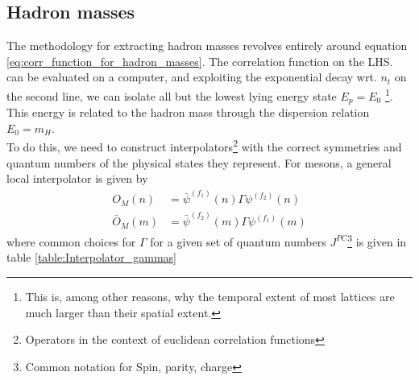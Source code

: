 \documentclass[a4paper,10pt]{book}
\begin{document}
\subsection{Hadron masses}\label{hadron_masses}
The methodology for extracting hadron masses revolves entirely around equation \eqref{eq:corr_function_for_hadron_masses}. The correlation function on the LHS. can be evaluated on a computer, and exploiting the exponential decay wrt. $n_t$ on the second line, we can isolate all but the lowest lying energy state $E_p=E_0$ \footnote{This is, among other reasons, why the temporal extent of most lattices are much larger than their spatial extent.}. This energy is related to the hadron mass through the dispersion relation $E_0 = m_H$.\\ To do this, we need to construct interpolators\footnote{Operators in the context of euclidean correlation functions} with the correct symmetries and quantum numbers of the physical states they represent. For mesons, a general local interpolator is given by
\begin{equation}
\begin{aligned} 
O_{M}(n)&=\bar{\psi}^{\left(f_{1}\right)}(n) \Gamma \psi^{\left(f_{2}\right)}(n)\\ \bar{O}_{M}(m)&=\bar{\psi}^{\left(f_{2}\right)}(m) \Gamma \psi^{\left(f_{1}\right)}(m)
\end{aligned}
\end{equation}
where common choices for $\Gamma$ for a given set of quantum numbers $J^{P C}$\footnote{Common notation for Spin, parity, charge} is given in table \ref{table:Interpolator_gammas}
\end{document}
